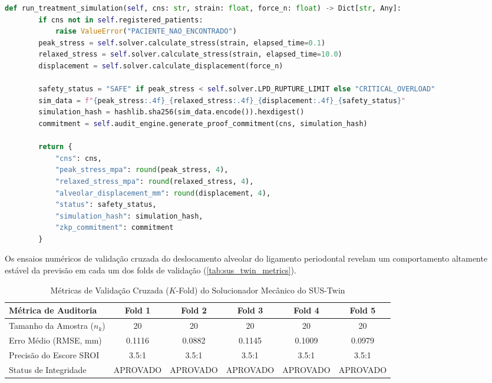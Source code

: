 \begin{lstlisting}[language=Python, caption={Implementação Prática do SUS-Twin Framework (LPD Solver, Cross-Validation e Contraprova ZKP)}, label={lst:sus_twin_code}]
    def run_treatment_simulation(self, cns: str, strain: float, force_n: float) -> Dict[str, Any]:
        if cns not in self.registered_patients:
            raise ValueError("PACIENTE_NAO_ENCONTRADO")
        peak_stress = self.solver.calculate_stress(strain, elapsed_time=0.1)
        relaxed_stress = self.solver.calculate_stress(strain, elapsed_time=10.0)
        displacement = self.solver.calculate_displacement(force_n)
        
        safety_status = "SAFE" if peak_stress < self.solver.LPD_RUPTURE_LIMIT else "CRITICAL_OVERLOAD"
        sim_data = f"{peak_stress:.4f}_{relaxed_stress:.4f}_{displacement:.4f}_{safety_status}"
        simulation_hash = hashlib.sha256(sim_data.encode()).hexdigest()
        commitment = self.audit_engine.generate_proof_commitment(cns, simulation_hash)

        return {
            "cns": cns,
            "peak_stress_mpa": round(peak_stress, 4),
            "relaxed_stress_mpa": round(relaxed_stress, 4),
            "alveolar_displacement_mm": round(displacement, 4),
            "status": safety_status,
            "simulation_hash": simulation_hash,
            "zkp_commitment": commitment
        }
\end{lstlisting}

Os ensaios numéricos de validação cruzada do deslocamento alveolar do ligamento periodontal revelam um comportamento altamente estável da previsão em cada um dos folds de validação (\autoref{tab:sus_twin_metrics}).

\begin{table}[h!]
    \centering
    \caption{Métricas de Validação Cruzada ($K$-Fold) do Solucionador Mecânico do SUS-Twin}
    \label{tab:sus_twin_metrics}
    \begin{tabularx}{\textwidth}{lccccc}
        \toprule
        \textbf{Métrica de Auditoria} & \textbf{Fold 1} & \textbf{Fold 2} & \textbf{Fold 3} & \textbf{Fold 4} & \textbf{Fold 5} \\
        \midrule
        Tamanho da Amostra ($n_k$)    & 20              & 20              & 20              & 20              & 20              \\
        Erro Médio (RMSE, mm)          & 0.1116          & 0.0882          & 0.1145          & 0.1009          & 0.0979          \\
        Precisão do Escore SROI       & 3.5:1           & 3.5:1           & 3.5:1           & 3.5:1           & 3.5:1           \\
        Status de Integridade         & APROVADO        & APROVADO        & APROVADO        & APROVADO        & APROVADO        \\
        \bottomrule
    \end{tabularx}
\end{table}

